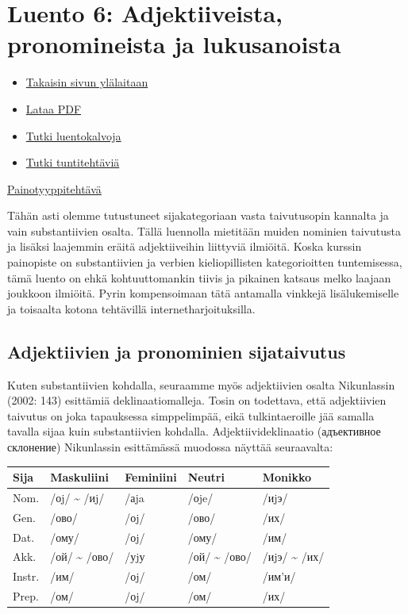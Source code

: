 \documentclass[]{scrartcl}
\providecommand{\tightlist}{%
  \setlength{\itemsep}{0pt}\setlength{\parskip}{0pt}}
\begin{document}
\section{Luento 6: Adjektiiveista, pronomineista ja
lukusanoista}\label{luento-6-adjektiiveista-pronomineista-ja-lukusanoista}

\begin{itemize}
\tightlist
\item
  \href{https://mustikka.uta.fi/~juho_harme/morfologia/\#tästä-kurssista}{Takaisin
  sivun ylälaitaan}
\item
  \href{http://mustikka.uta.fi/~juho_harme/morfologia/materiaalit/luento6.pdf}{Lataa
  PDF}
\item
  \href{http://mustikka.uta.fi/~juho_harme/morfologia/presentations/luento6.html}{Tutki
  luentokalvoja}
\item
  \href{http://mustikka.uta.fi/~juho_harme/morfologia/tehtavat/luento6.pdf}{Tutki
  tuntitehtäviä}
\end{itemize}

\href{https://docs.google.com/spreadsheets/d/1n4WqBONRjtiLKoFl87xQpMH8qGzxT6h7b2oViWuws8k/edit?usp=sharing}{Painotyyppitehtävä}

Tähän asti olemme tutustuneet sijakategoriaan vasta taivutusopin
kannalta ja vain substantiivien osalta. Tällä luennolla mietitään muiden
nominien taivutusta ja lisäksi laajemmin eräitä adjektiiveihin liittyviä
ilmiöitä. Koska kurssin painopiste on substantiivien ja verbien
kieliopillisten kategorioitten tuntemisessa, tämä luento on ehkä
kohtuuttomankin tiivis ja pikainen katsaus melko laajaan joukkoon
ilmiöitä. Pyrin kompensoimaan tätä antamalla vinkkejä lisälukemiselle ja
toisaalta kotona tehtävillä internetharjoituksilla.

\subsection{Adjektiivien ja pronominien
sijataivutus}\label{adjektiivien-ja-pronominien-sijataivutus}

Kuten substantiivien kohdalla, seuraamme myös adjektiivien osalta
Nikunlassin (2002: 143) esittämiä deklinaatiomalleja. Tosin on
todettava, että adjektiivien taivutus on joka tapauksessa simppelimpää,
eikä tulkintaeroille jää samalla tavalla sijaa kuin substantiivien
kohdalla. Adjektiivideklinaatio (адъективное склонение) Nikunlassin
esittämässä muodossa näyttää seuraavalta:

\begin{longtable}[c]{@{}lllll@{}}
\toprule
Sija & Maskuliini & Feminiini & Neutri & Monikko\tabularnewline
\midrule
\endhead
Nom. & /оj/ \textasciitilde{} /иj/ & /аja & /оje/ & /иjэ/\tabularnewline
Gen. & /ово/ & /оj/ & /ово/ & /их/\tabularnewline
Dat. & /ому/ & /оj/ & /ому/ & /им/\tabularnewline
Akk. & /ой/ \textasciitilde{} /ово/ & /уjу & /ой/ \textasciitilde{}
/ово/ & /иjэ/ \textasciitilde{} /их/\tabularnewline
Instr. & /им/ & /оj/ & /ом/ & /им'и/\tabularnewline
Prep. & /ом/ & /оj/ & /ом/ & /их/\tabularnewline
\bottomrule
\end{longtable}
\end{document}
